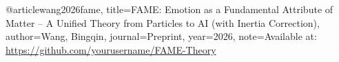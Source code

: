@article{wang2026fame,
  title={FAME: Emotion as a Fundamental Attribute of Matter – A Unified Theory from Particles to AI (with Inertia Correction)},
  author={Wang, Bingqin},
  journal={Preprint},
  year={2026},
  note={Available at: \url{https://github.com/yourusername/FAME-Theory}}
}